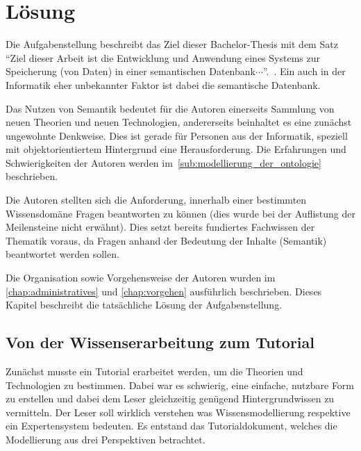 \chapter{Lösung}
\label{chap:loesung}
Die Aufgabenstellung beschreibt das Ziel dieser Bachelor-Thesis mit dem Satz ``Ziel dieser Arbeit ist die Entwicklung und Anwendung eines Systems zur Speicherung (von Daten) in einer semantischen Datenbank$\cdots$''.~\cite{Aufgabenstellung}. Ein auch in der Informatik eher unbekannter Faktor ist dabei die semantische Datenbank.

Das Nutzen von Semantik bedeutet für die Autoren einerseits Sammlung von neuen Theorien und neuen Technologien, andererseits beinhaltet es eine zunächst ungewohnte Denkweise. Dies ist gerade für Personen aus der Informatik, speziell mit objektorientiertem Hintergrund eine Herausforderung. Die Erfahrungen und Schwierigkeiten der Autoren werden im~\autoref{sub:modellierung_der_ontologie} beschrieben.

Die Autoren stellten sich die Anforderung, innerhalb einer bestimmten Wissensdomäne Fragen beantworten zu können (dies wurde bei der Auflistung der Meilensteine nicht erwähnt). Dies setzt bereits fundiertes Fachwissen der Thematik voraus, da Fragen anhand der Bedeutung der Inhalte (Semantik) beantwortet werden sollen.

Die Organisation sowie Vorgehensweise der Autoren wurden im \autoref{chap:administratives} und \autoref{chap:vorgehen} ausführlich beschrieben. Dieses Kapitel beschreibt die tatsächliche Lösung der Aufgabenstellung.

\section{Von der Wissenserarbeitung zum Tutorial}
\label{sec:loesung_tutorial}
Zunächst musste ein Tutorial erarbeitet werden, um die Theorien und Technologien zu bestimmen. Dabei war es schwierig, eine einfache, nutzbare Form zu erstellen und dabei dem Leser gleichzeitig genügend Hintergrundwissen zu vermitteln. Der Leser soll wirklich verstehen was Wissensmodellierung respektive ein Expertensystem bedeuten. Es entstand das Tutorialdokument, welches die Modellierung aus drei Perspektiven betrachtet. %

